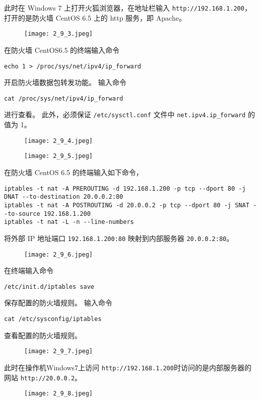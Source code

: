 此时在 Windows 7 上打开火狐浏览器，在地址栏输入
\texttt{http://192.168.1.200}，打开的是防火墙 CentOS 6.5 上的
http 服务，即 Apache。
\begin{figure}[H]
  \begin{center}
    \texttt{[image: 2\_9\_3.jpeg]}
  \end{center}
\end{figure}

在防火墙 CentOS6.5 的终端输入命令
\begin{verbatim}
echo 1 > /proc/sys/net/ipv4/ip_forward
\end{verbatim}
开启防火墙数据包转发功能。
输入命令
\begin{verbatim}
cat /proc/sys/net/ipv4/ip_forward
\end{verbatim}
进行查看。
此外，必须保证 \texttt{/etc/sysctl.conf} 文件中
\texttt{net.ipv4.ip_forward} 的值为 1。
\begin{figure}[H]
  \begin{center}
    \texttt{[image: 2\_9\_4.jpeg]}
  \end{center}
\end{figure}
\begin{figure}[H]
  \begin{center}
    \texttt{[image: 2\_9\_5.jpeg]}
  \end{center}
\end{figure}

在防火墙 CentOS 6.5 的终端输入如下命令，
\begin{verbatim}
iptables -t nat -A PREROUTING -d 192.168.1.200 -p tcp --dport 80 -j DNAT --to-destination 20.0.0.2:80
iptables -t nat -A POSTROUTING -d 20.0.0.2 -p tcp --dport 80 -j SNAT --to-source 192.168.1.200
iptables -t nat -L -n --line-numbers
\end{verbatim}
将外部 IP 地址端口 \texttt{192.168.1.200:80} 映射到内部服务器
\texttt{20.0.0.2:80}。
\begin{figure}[H]
  \begin{center}
    \texttt{[image: 2\_9\_6.jpeg]}
  \end{center}
\end{figure}

在终端输入命令
\begin{verbatim}
/etc/init.d/iptables save
\end{verbatim}
保存配置的防火墙规则。
输入命令
\begin{verbatim}
cat /etc/sysconfig/iptables
\end{verbatim}
查看配置的防火墙规则。
\begin{figure}[H]
  \begin{center}
    \texttt{[image: 2\_9\_7.jpeg]}
  \end{center}
\end{figure}

此时在操作机Windows7上访问
\texttt{http://192.168.1.200}时访问的是内部服务器的网站
\texttt{http://20.0.0.2}。
\begin{figure}[H]
  \begin{center}
    \texttt{[image: 2\_9\_8.jpeg]}
  \end{center}
\end{figure}

